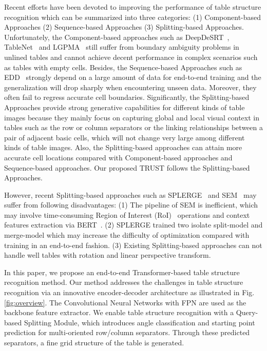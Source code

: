 \documentclass[lettersize,journal]{IEEEtran}
\begin{document}
Recent efforts have been devoted to improving the performance of table structure recognition which can be summarized into three categories: (1) Component-based Approaches (2) Sequence-based Approaches (3) Splitting-based Approaches. Unfortunately, the Component-based approaches such as DeepDeSRT~\cite{schreiber2017deepdesrt}, TableNet~\cite{paliwal2019tablenet} and LGPMA~\cite{qiao2021lgpma} still suffer from boundary ambiguity problems in unlined tables and cannot achieve decent performance in complex scenarios such as tables with empty cells. Besides, the Sequence-based Approaches such as EDD~\cite{zhong2020image} strongly depend on a large amount of data for end-to-end training and the generalization will drop sharply when encountering unseen data. Moreover, they often fail to regress accurate cell boundaries. Significantly, the Splitting-based Approaches provide strong generative capabilities for different kinds of table images because they mainly focus on capturing global and local visual context in tables such as the row or column separators or the linking relationships between a pair of adjacent basic cells, which will not change very large among different kinds of table images. Also, the Splitting-based approaches can attain more accurate cell locations compared with Component-based approaches and Sequence-based approaches. Our proposed TRUST follows the Splitting-based Approaches. 

However, recent Splitting-based approaches such as SPLERGE~\cite{tensmeyer2019deep} and SEM~\cite{zhang2022split} may suffer from following disadvantages: (1) The pipeline of SEM is inefficient, which may involve time-consuming Region of Interest (RoI)~\cite{ren2015faster} operations and context features extraction via BERT~\cite{DBLP:journals/corr/abs-1810-04805}. (2) SPLERGE trained two isolate split-model and merge-model which may increase the difficulty of optimization compared with training in an end-to-end fashion. (3) Existing Splitting-based approaches can not handle well tables with rotation and linear perspective transform.

In this paper, we propose an end-to-end Transformer-based table structure recognition method. Our method addresses the challenges in table structure recognition via an innovative encoder-decoder architecture as illustrated in Fig.\ref{fig:overview}. The Convolutional Neural Networks with FPN are used as the backbone feature extractor. We enable table structure recognition with a Query-based Splitting Module, which introduces angle classification and starting point prediction for multi-oriented row/column separators. Through these predicted separators, a fine grid structure of the table is generated. 
\end{document}
